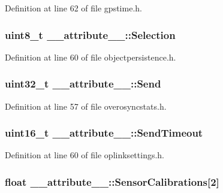 \-Definition at line 62 of file gpstime.\-h.

\hypertarget{struct____attribute_____a310f6a6fd620dc4a2162e3db8a11545e}{
\subsubsection[{\-Selection}]{\setlength{\rightskip}{0pt plus 5cm}uint8\-\_\-t {\bf \-\_\-\-\_\-attribute\-\_\-\-\_\-\-::\-Selection}}}\label{struct____attribute_____a310f6a6fd620dc4a2162e3db8a11545e}


\-Definition at line 60 of file objectpersistence.\-h.

\hypertarget{struct____attribute_____a89f1653eb99d64b4699ada7f5ed283fa}{
\subsubsection[{\-Send}]{\setlength{\rightskip}{0pt plus 5cm}uint32\-\_\-t {\bf \-\_\-\-\_\-attribute\-\_\-\-\_\-\-::\-Send}}}\label{struct____attribute_____a89f1653eb99d64b4699ada7f5ed283fa}


\-Definition at line 57 of file overosyncstats.\-h.

\hypertarget{struct____attribute_____a6863757f230df9c593c0e883afa62630}{
\subsubsection[{\-Send\-Timeout}]{\setlength{\rightskip}{0pt plus 5cm}uint16\-\_\-t {\bf \-\_\-\-\_\-attribute\-\_\-\-\_\-\-::\-Send\-Timeout}}}\label{struct____attribute_____a6863757f230df9c593c0e883afa62630}


\-Definition at line 60 of file oplinksettings.\-h.

\hypertarget{struct____attribute_____a6948653e69d7d242a920a5f1e6ca233d}{
\subsubsection[{\-Sensor\-Calibrations}]{\setlength{\rightskip}{0pt plus 5cm}float {\bf \-\_\-\-\_\-attribute\-\_\-\-\_\-\-::\-Sensor\-Calibrations}\mbox{[}2\mbox{]}}}\label{struct____attribute_____a6948653e69d7d242a920a5f1e6ca233d}


